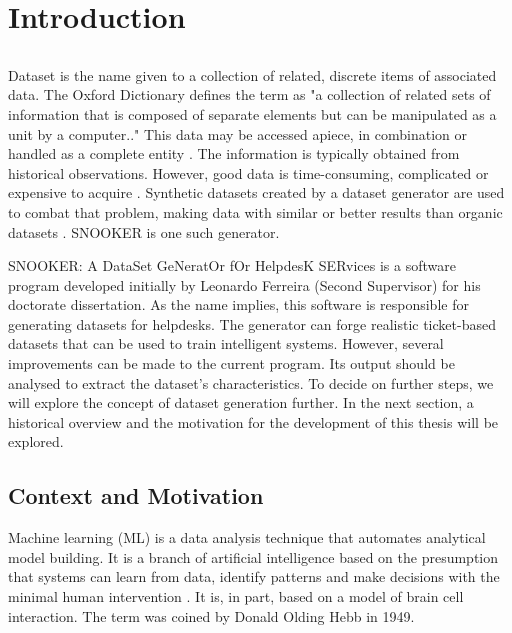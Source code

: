 \chapter{Introduction}
\label{chap:intro}

\section*{}
Dataset is the name given to a collection of related, discrete items of associated data. The Oxford Dictionary defines the term as "a collection of related sets of information that is composed of separate elements but can be manipulated as a unit by a computer.." This data may be accessed apiece, in combination or handled as a complete entity \citep{akhter2019cyber}. The information is typically obtained from historical observations. However, good data is time-consuming, complicated or expensive to acquire \citep{Kar_2019_ICCV}. Synthetic datasets created by a dataset generator are used to combat that problem, making data with similar or better results than organic datasets \citep{anantrasirichai2019deep, Arvanitis2021.02.11.21250741}. SNOOKER is one such generator.

SNOOKER: A DataSet GeNeratOr fOr HelpdesK SERvices is a software program developed initially by Leonardo Ferreira (Second Supervisor) for his doctorate dissertation. As the name implies, this software is responsible for generating datasets for helpdesks. The generator can forge realistic ticket-based datasets that can be used to train intelligent systems. However, several improvements can be made to the current program. Its output should be analysed to extract the dataset's characteristics. To decide on further steps, we will explore the concept of dataset generation further. In the next section, a historical overview and the motivation for the development of this thesis will be explored.

\section{Context and Motivation}
Machine learning (ML) is a data analysis technique that automates analytical model building. It is a branch of artificial intelligence based on the presumption that systems can learn from data, identify patterns and make decisions with the minimal human intervention \citep{wong2021use}. It is, in part, based on a model of brain cell interaction. The term was coined by Donald Olding Hebb in 1949.

